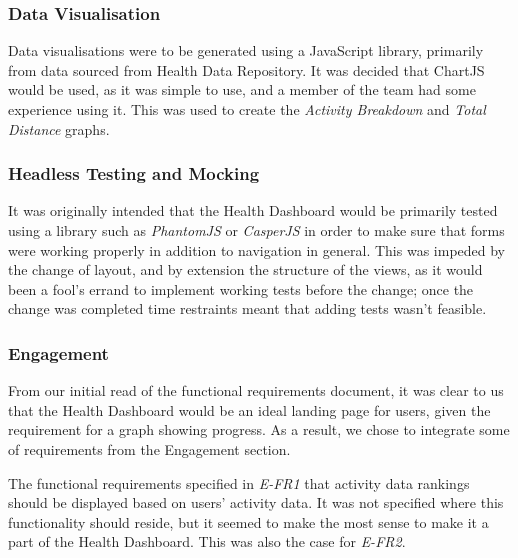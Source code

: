 \subsubsection{Data Visualisation}
\par
Data visualisations were to be generated using a JavaScript library, primarily from data sourced from Health Data Repository. It was decided that ChartJS\cite{chartjs} would be used, as it was simple to use, and a member of the team had some experience using it. This was used to create the \textit{Activity Breakdown} and \textit{Total Distance} graphs.

\subsubsection{Headless Testing and Mocking}
\par
It was originally intended that the Health Dashboard would be primarily tested using a library such as \textit{PhantomJS} or \textit{CasperJS} in order to make sure that forms were working properly in addition to navigation in general. This was impeded by the change of layout, and by extension the structure of the views, as it would been a fool's errand to implement working tests before the change; once the change was completed time restraints meant that adding tests wasn't feasible.

\subsubsection{Engagement}
\par
From our initial read of the functional requirements document, it was clear to us that the Health Dashboard would be an ideal landing page for users, given the requirement for a graph showing progress. As a result, we chose to integrate some of requirements from the Engagement section.

\par
The functional requirements specified in \textit{E-FR1} that activity data rankings should be displayed based on users' activity data. It was not specified where this functionality should reside, but it seemed to make the most sense to make it a part of the Health Dashboard. This was also the case for \textit{E-FR2}.

